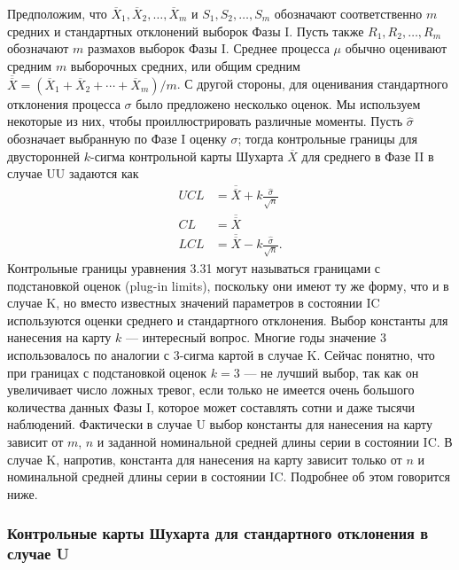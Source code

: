 Предположим, что \(\overline{X}_1, \overline{X}_2, \ldots, \overline{X}_m\) и \(S_1, S_2, \ldots, S_m\) обозначают соответственно \(m\) средних и стандартных отклонений выборок Фазы I. Пусть также \(R_1, R_2, \ldots, R_m\) обозначают \(m\) размахов выборок Фазы I. Среднее процесса \(\mu\) обычно оценивают средним \(m\) выборочных средних, или общим средним \(\overline{\overline{X}} = (\overline{X}_1 + \overline{X}_2 + \cdots + \overline{X}_m)/m\). С другой стороны, для оценивания стандартного отклонения процесса \(\sigma\) было предложено несколько оценок. Мы используем некоторые из них, чтобы проиллюстрировать различные моменты. Пусть \(\hat{\sigma}\) обозначает выбранную по Фазе I оценку \(\sigma\); тогда контрольные границы для двусторонней \(k\)-сигма контрольной карты Шухарта \(\overline{X}\) для среднего в Фазе II в случае UU задаются как
\begin{equation}
	\begin{aligned}
		UCL &= \overline{\overline{X}} + k\frac{\hat{\sigma}}{\sqrt{n}} \\
		CL &= \overline{\overline{X}} \\
		LCL &= \overline{\overline{X}} - k\frac{\hat{\sigma}}{\sqrt{n}}.
	\end{aligned}
	\label{eq:3.31}
\end{equation}
Контрольные границы уравнения 3.31 могут называться границами с подстановкой оценок (plug-in limits), поскольку они имеют ту же форму, что и в случае K, но вместо известных значений параметров в состоянии IC используются оценки среднего и стандартного отклонения. Выбор константы для нанесения на карту \(k\) — интересный вопрос. Многие годы значение 3 использовалось по аналогии с 3-сигма картой в случае K. Сейчас понятно, что при границах с подстановкой оценок \(k = 3\) — не лучший выбор, так как он увеличивает число ложных тревог, если только не имеется очень большого количества данных Фазы I, которое может составлять сотни и даже тысячи наблюдений. Фактически в случае U выбор константы для нанесения на карту зависит от \(m\), \(n\) и заданной номинальной средней длины серии в состоянии IC. В случае K, напротив, константа для нанесения на карту зависит только от \(n\) и номинальной средней длины серии в состоянии IC. Подробнее об этом говорится ниже.

\subsubsection{Контрольные карты Шухарта для стандартного отклонения в случае U}

